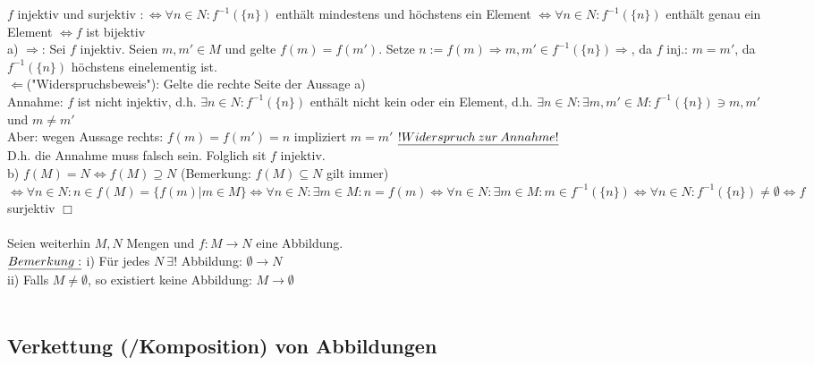 \documentclass[fleqn, a4paper, 11pt]{article}
\begin{document}
$f$ injektiv und surjektiv $:\Leftrightarrow \forall n\in N:f^{-1}(\{n\})$ enth\"alt mindestens und h\"ochstens ein Element $\Leftrightarrow\forall n\in N:f^{-1}(\{n\})$ enth\"alt genau ein Element $\Leftrightarrow f$ ist bijektiv \\
a) \dq$\Rightarrow$\dq: Sei $f$ injektiv. Seien $m,m'\in M$ und gelte $f(m)=f(m')$. Setze $n:=f(m)\Rightarrow m,m'\in f^{-1}(\{n\}) \Rightarrow$, da $f$ inj.: $m=m'$, da $f^{-1}(\{n\})$ h\"ochstens einelementig ist.\\
\dq$\Leftarrow$\dq ("Widerspruchsbeweis"): Gelte die rechte Seite der Aussage a)\\
Annahme: $f$ ist nicht injektiv, d.h. $\exists n\in N: f^{-1}(\{n\})$ enth\"alt nicht kein oder ein Element, d.h. $\exists n\in N:\exists m,m'\in M:f^{-1}(\{n\})\ni m,m'$ und $m\neq m'$\\
Aber: wegen Aussage rechts: $f(m)=f(m')=n$ impliziert $m=m'$ $\uline{!Widerspruch\:zur\:Annahme!}$\\
D.h. die Annahme muss falsch sein. Folglich sit $f$ injektiv.\\
b) $f(M)=N\Leftrightarrow f(M)\supseteq N$ (Bemerkung: $f(M)\subseteq N$ gilt immer) $\Leftrightarrow \forall n\in N:n\in f(M)=\{f(m)|m\in M\} \Leftrightarrow \forall n\in N:\exists m\in M:n=f(m)\Leftrightarrow\forall n\in N:\exists m\in M:m\in f^{-1}(\{n\})\Leftrightarrow\forall n\in N:f^{-1}(\{n\})\neq\emptyset\Leftrightarrow f$ surjektiv \hfill $\Box$\\
\\
Seien weiterhin $M,N$ Mengen und $f:M\rightarrow N$ eine Abbildung.\\
$\uline{Bemerkung:}$ i) F\"ur jedes $N\:\exists !$ Abbildung: $\emptyset\rightarrow N$\\
ii) Falls $M\neq\emptyset$, so existiert keine Abbildung: $M\rightarrow\emptyset$\\
\\
\subsection{Verkettung (/Komposition) von Abbildungen}
\end{document}
